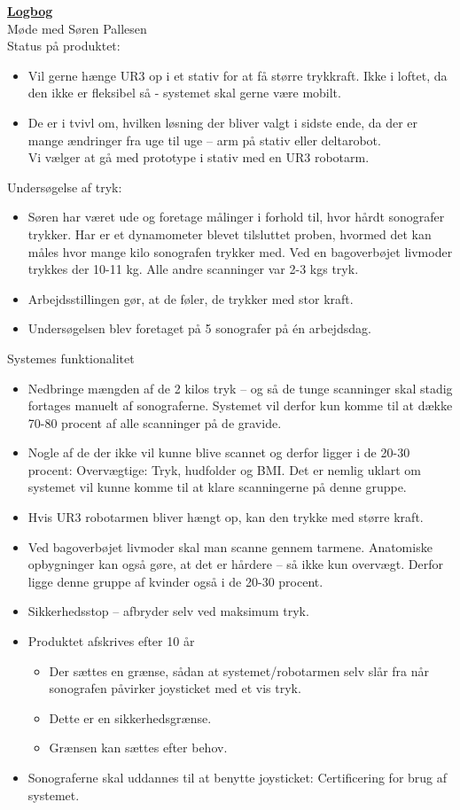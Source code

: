\underline{\textbf{Logbog}}\\
Møde med Søren Pallesen\\
Status på produktet:
\begin{itemize}
\item Vil gerne hænge UR3 op i et stativ for at få større trykkraft. Ikke i loftet, da den ikke er fleksibel så - systemet skal gerne være mobilt. 
\item De er i tvivl om, hvilken løsning der bliver valgt i sidste ende, da der er mange ændringer fra uge til uge – arm på stativ eller deltarobot. \\
Vi vælger at gå med prototype i stativ med en UR3 robotarm. 
\end{itemize}
Undersøgelse af tryk:
\begin{itemize}
\item Søren har været ude og foretage målinger i forhold til, hvor hårdt sonografer trykker. Har er et dynamometer blevet tilsluttet proben, hvormed det kan måles hvor mange kilo sonografen trykker med. Ved en bagoverbøjet livmoder trykkes der 10-11 kg. Alle andre scanninger var 2-3 kgs tryk. 
\item Arbejdsstillingen gør, at de føler, de trykker med stor kraft. 
\item Undersøgelsen blev foretaget på 5 sonografer på én arbejdsdag.
\end{itemize}
Systemes funktionalitet
\begin{itemize}
\item Nedbringe mængden af de 2 kilos tryk – og så de tunge scanninger skal stadig fortages manuelt af sonograferne. Systemet vil derfor kun komme til at dække 70-80 procent af alle scanninger på de gravide. 
\item Nogle af de der ikke vil kunne blive scannet og derfor ligger i de 20-30 procent: Overvægtige: Tryk, hudfolder og BMI. Det er nemlig uklart om systemet vil kunne komme til at klare scanningerne på denne gruppe.
\item Hvis UR3 robotarmen bliver hængt op, kan den trykke med større kraft. 
\item Ved bagoverbøjet livmoder skal man scanne gennem tarmene. Anatomiske opbygninger kan også gøre, at det er hårdere – så ikke kun overvægt. Derfor ligge denne gruppe af kvinder også i de 20-30 procent.
\item Sikkerhedsstop – afbryder selv ved maksimum tryk. 
\item Produktet afskrives efter 10 år
\begin{itemize}
\item Der sættes en grænse, sådan at systemet/robotarmen selv slår fra når sonografen påvirker joysticket med et vis tryk.
\item Dette er en sikkerhedsgrænse.
\item Grænsen kan sættes efter behov.
\end{itemize}
\item Sonograferne skal uddannes til at benytte joysticket: Certificering for brug af systemet.
\end{itemize}
